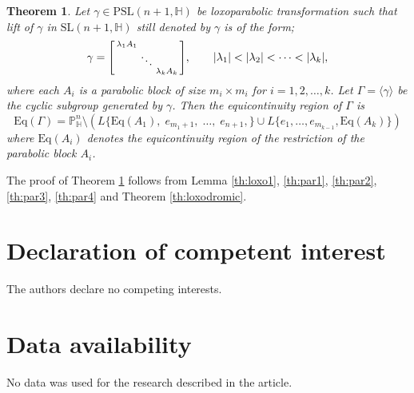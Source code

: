 \documentclass[12pt,reqno]{amsart}
\numberwithin{equation}{section}
\newtheorem{theorem}{Theorem}[section]
\theoremstyle{definition}
\def\H{\mathbb H}
\def\P{\mathbb P}
\def\H{\mathbb {H}}
\begin{document}
\begin{theorem}
\label{th:loxoparabolic}
Let $\gamma \in \mathrm{PSL}(n+1,\mathbb{H})$ be loxoparabolic transformation such that lift of $\gamma$ in $\mathrm{SL}(n+1,\H)$ still denoted by $\gamma$ is of the form;
\[
\gamma =
\begin{bsmallmatrix}
\lambda_1 A_1 & & \\
& \ddots & \\
& & \lambda_k A_k
\end{bsmallmatrix},
\qquad |\lambda_1|<|\lambda_2|<\cdots<|\lambda_k|,
\]
where each $A_i$ is a parabolic block of size $m_i\times m_i$ for $i=1,2,\ldots, k$.
Let $\Gamma=\langle\gamma\rangle$ be the cyclic subgroup generated by $\gamma$.
Then the equicontinuity region of $\Gamma$ is
\[
\mathrm{Eq}(\Gamma)
=
\P^n_\H\setminus\left({L}\Big\{
\mathrm{Eq}(A_1),\;
e_{m_1+1},\;\dots,\;e_{n+1},
\Big\} \cup {L}\Big\{
e_1, \dots,
e_{m_{k-1}},\mathrm{Eq}(A_k)
\Big\}\right)
\]
where
$\mathrm{Eq}(A_i)$ denotes the equicontinuity region of the restriction of the parabolic block $A_i$.
\end{theorem}

The proof of Theorem \ref{th:loxoparabolic} follows from Lemma \ref{th:loxo1}, \ref{th:par1}, \ref{th:par2}, \ref{th:par3}, \ref{th:par4} and Theorem \ref{th:loxodromic}.



    \section*{Declaration of competent interest }
    The authors declare no competing interests.
    \section*{Data availability}
    No data was used for the research described in the article.
\end{document}

